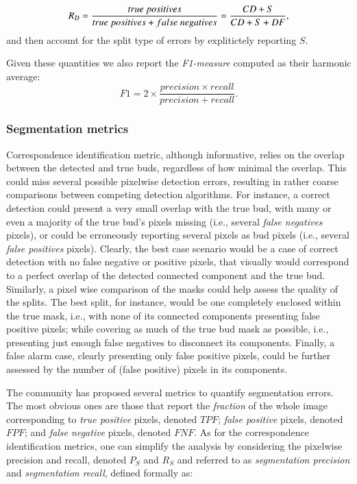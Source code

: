 \documentclass[a4paper,authoryear,review]{elsarticle}
\begin{document}
\begin{equation}
    R_D = \frac{true\ positives}{true\ positives+false\ negatives} \\
= \frac{CD+S}{CD+S+DF},
    \label{eq:detection-recall}
\end{equation}
and then account for the split type of errors by explitictely reporting $S$. 

Given these quantities we also report the \emph{F1-measure} computed as their harmonic average:
\[
    F1 = 2 \times \frac{precision \times recall}{precision + recall}.
\] 


 \subsubsection{Segmentation metrics} \label{subsec:segmetrics}

Correspondence identification metric, although informative, relies on  the overlap between the detected and true buds, regardless of how minimal the overlap. This could miss several possible pixelwise detection errors, resulting in rather coarse comparisons between competing detection algorithms. For instance, a correct detection could present a very small overlap with the true bud, with many or even a majority of the true bud’s pixels missing (i.e., several \emph{false negatives} pixels), or could be erroneously reporting several pixels as bud pixels (i.e., several \emph{false positives} pixels). Clearly, the best case scenario would be a case of correct detection with no false negative or positive pixels, that visually would correspond to a perfect overlap of the detected connected component and the true bud. 
%
Similarly, a pixel wise comparison of the masks could help assess the quality of the splits. The best split, for instance, would be one completely enclosed within the true mask, i.e., with none of its connected components presenting false positive pixels; while covering as much of the true bud mask as possible, i.e., presenting just enough false negatives to disconnect its components. 
%
Finally, a false alarm case, clearly presenting only false positive pixels, could be further assessed by the number of (false positive) pixels in its components. 

The community has proposed several metrics to quantify segmentation errors. The most obvious ones are those that 
report the \emph{fraction} of the whole image corresponding to \emph{true positive} pixels, denoted $TPF$; \emph{false positive} pixels,  denoted $FPF$;  and \emph{false negative} pixels, denoted $FNF$. 
%
As for the correspondence identification metrics, one can simplify the analysis by considering the  pixelwise precision and recall, denoted $P_S$ and $R_S$ and referred to as \emph{segmentation precision}  and \emph{segmentation recall}, defined formally as: 
\end{document}
